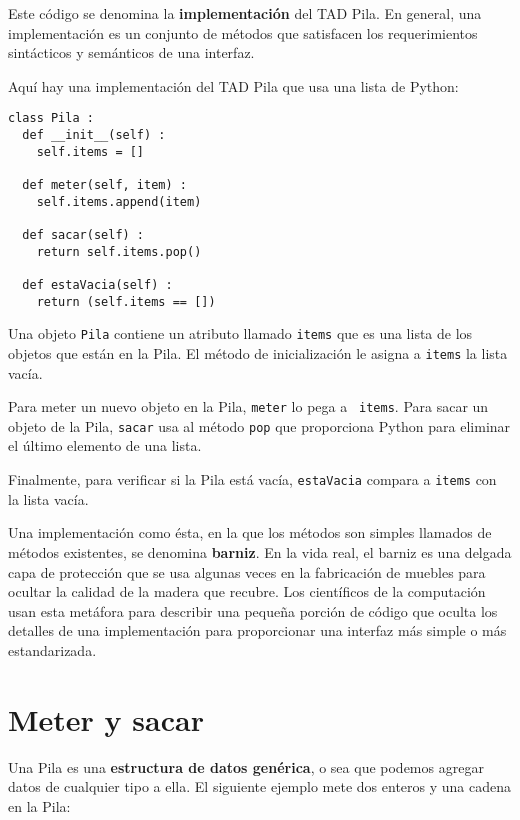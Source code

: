 Este código se denomina la  {\bf implementación} del TAD Pila.
En general, una implementación es un conjunto de métodos que
satisfacen los requerimientos sintácticos y semánticos de una
interfaz.

Aquí hay una implementación del TAD Pila que usa una lista de
Python:

\beforeverb
\begin{verbatim}
class Pila :
  def __init__(self) :
    self.items = []

  def meter(self, item) :
    self.items.append(item)

  def sacar(self) :
    return self.items.pop()

  def estaVacia(self) :
    return (self.items == [])
\end{verbatim}
\afterverb
%
Una objeto \texttt{Pila} contiene un atributo llamado \texttt{items}
que es una lista de los objetos que están en la Pila. El método de
inicialización le asigna a \texttt{items} la lista vacía.

Para meter un nuevo objeto en la Pila, \texttt{meter} lo pega a {\tt
items}.  Para sacar un objeto de la Pila, \texttt{sacar} usa al
método \texttt{pop} que proporciona Python para eliminar el último
elemento de una lista.

Finalmente, para verificar si la Pila está vacía, \texttt{estaVacia}
compara a \texttt{items} con la lista vacía.


Una implementación como ésta, en la que los métodos son simples 
llamados de métodos existentes, se denomina  {\bf barniz}.  En la
vida real, el barniz es una delgada capa de protección  que se 
usa algunas veces en la fabricación de muebles para ocultar la 
calidad de la madera que recubre.  Los científicos de la computación
usan esta metáfora para describir una pequeña porción de código
que oculta los detalles de una implementación para proporcionar 
una interfaz más simple o más estandarizada.


\section{Meter y sacar}

Una Pila es una {\bf estructura de datos genérica}, o sea que 
podemos agregar datos de cualquier tipo a ella. El siguiente
ejemplo mete dos enteros y una cadena en la Pila:


